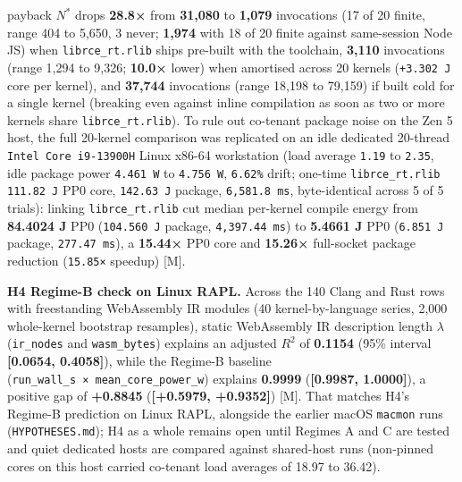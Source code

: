 \documentclass[10pt,letterpaper]{article}
\begin{document}
payback \(N^*\) drops \textbf{28.8×} from \textbf{31,080} to
\textbf{1,079} invocations (17 of 20 finite, range 404 to 5,650, 3
never; \textbf{1,974} with 18 of 20 finite against same-session Node JS)
when \texttt{librce\_\allowbreak{}rt.\allowbreak{}rlib} ships pre-built with the toolchain,
\textbf{3,110} invocations (range 1,294 to 9,326; \textbf{10.0×} lower)
when amortised across 20 kernels (\texttt{+3.302\ J} core per kernel),
and \textbf{37,744} invocations (range 18,198 to 79,159) if built cold
for a single kernel (breaking even against inline compilation as soon as
two or more kernels share \texttt{librce\_\allowbreak{}rt.\allowbreak{}rlib}). To rule out
co-tenant package noise on the Zen 5 host, the full 20-kernel comparison
was replicated on an idle dedicated 20-thread
\texttt{Intel\ Core\ i9-\allowbreak{}13900H} Linux x86-64 workstation (load average
\texttt{1.19} to \texttt{2.35}, idle package power \texttt{4.461\ W} to
\texttt{4.756\ W}, \texttt{6.62\%} drift; one-time
\texttt{librce\_\allowbreak{}rt.\allowbreak{}rlib} \texttt{111.82\ J} PP0 core, \texttt{142.63\ J}
package, \texttt{6,\allowbreak{}581.\allowbreak{}8\ ms}, byte-identical across 5 of 5 trials):
linking \texttt{librce\_\allowbreak{}rt.\allowbreak{}rlib} cut median per-kernel compile energy
from \textbf{84.4024 J} PP0 (\texttt{104.\allowbreak{}560\ J} package,
\texttt{4,\allowbreak{}397.\allowbreak{}44\ ms}) to \textbf{5.4661 J} PP0 (\texttt{6.851\ J}
package, \texttt{277.\allowbreak{}47\ ms}), a \textbf{15.44×} PP0 core and
\textbf{15.26×} full-socket package reduction (\texttt{15.85×} speedup)
{[}M{]}.

\textbf{H4 Regime-B check on Linux RAPL.} Across the 140 Clang and Rust
rows with freestanding WebAssembly IR modules (40 kernel-by-language
series, 2,000 whole-kernel bootstrap resamples), static WebAssembly IR
description length \(\lambda\) (\texttt{ir\_nodes} and
\texttt{wasm\_\allowbreak{}bytes}) explains an adjusted \(R^2\) of \textbf{0.1154}
(95\% interval \textbf{{[}0.0654, 0.4058{]}}), while the Regime-B
baseline (\texttt{run\_\allowbreak{}wall\_\allowbreak{}s\ ×\ mean\_\allowbreak{}core\_\allowbreak{}power\_\allowbreak{}w}) explains
\textbf{0.9999} (\textbf{{[}0.9987, 1.0000{]}}), a positive gap of
\textbf{+0.8845} (\textbf{{[}+0.5979, +0.9352{]}}) {[}M{]}. That matches
H4's Regime-B prediction on Linux RAPL, alongside the earlier macOS
\texttt{macmon} runs (\texttt{HYPOTHESES.\allowbreak{}md}); H4 as a whole remains
open until Regimes A and C are tested and quiet dedicated hosts are
compared against shared-host runs (non-pinned cores on this host carried
co-tenant load averages of 18.97 to 36.42).
\end{document}
